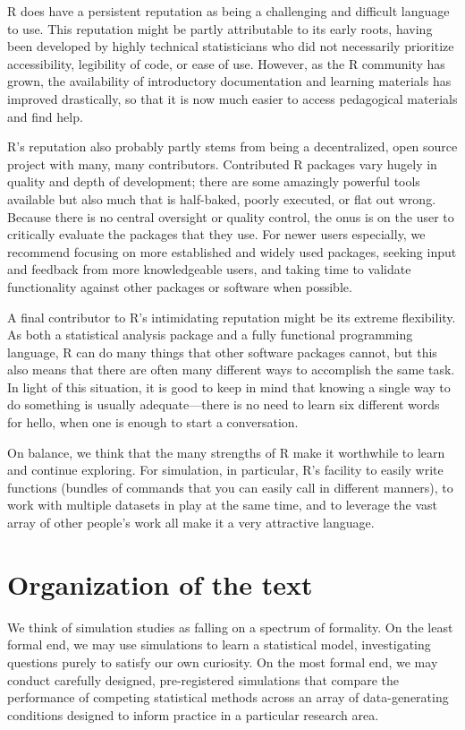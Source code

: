 \documentclass[
]{book}
\begin{document}
R does have a persistent reputation as being a challenging and difficult language to use.
This reputation might be partly attributable to its early roots, having been developed by highly technical statisticians who did not necessarily prioritize accessibility, legibility of code, or ease of use.
However, as the R community has grown, the availability of introductory documentation and learning materials has improved drastically, so that it is now much easier to access pedagogical materials and find help.

R's reputation also probably partly stems from being a decentralized, open source project with many, many contributors.
Contributed R packages vary hugely in quality and depth of development; there are some amazingly powerful tools available but also much that is half-baked, poorly executed, or flat out wrong.
Because there is no central oversight or quality control, the onus is on the user to critically evaluate the packages that they use.
For newer users especially, we recommend focusing on more established and widely used packages, seeking input and feedback from more knowledgeable users, and taking time to validate functionality against other packages or software when possible.

A final contributor to R's intimidating reputation might be its extreme flexibility.
As both a statistical analysis package and a fully functional programming language, R can do many things that other software packages cannot, but this also means that there are often many different ways to accomplish the same task.
In light of this situation, it is good to keep in mind that knowing a single way to do something is usually adequate---there is no need to learn six different words for hello, when one is enough to start a conversation.

On balance, we think that the many strengths of R make it worthwhile to learn and continue exploring. For simulation, in particular, R's facility to easily write functions (bundles of commands that you can easily call in different manners), to work with multiple datasets in play at the same time, and to leverage the vast array of other people's work all make it a very attractive language.

\section{Organization of the text}\label{organization-of-the-text}

We think of simulation studies as falling on a spectrum of formality.
On the least formal end, we may use simulations to learn a statistical model, investigating questions purely to satisfy our own curiosity.
On the most formal end, we may conduct carefully designed, pre-registered simulations that compare the performance of competing statistical methods across an array of data-generating conditions designed to inform practice in a particular research area.
\end{document}
